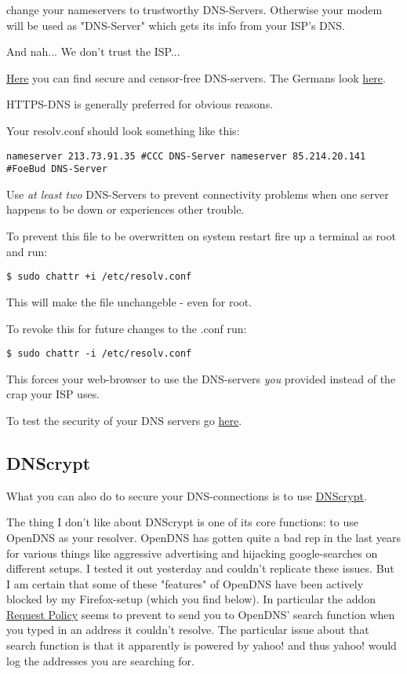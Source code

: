 \documentclass{article}
\begin{document}
 change your nameservers to trustworthy DNS-Servers. Otherwise your modem will be used as "DNS-Server" which gets its info from your ISP's DNS. 

And nah... We don't trust the ISP... 

\href{https://anonymous-proxy-servers.net/wiki/index.php/Censorship-free_DNS_servers}{Here} you can find secure and censor-free DNS-servers. The Germans look \href{https://www.awxcnx.de/handbuch_21g.htm}{here}.


 HTTPS-DNS is generally preferred for obvious reasons. 


 Your resolv.conf should look something like this: 
\begin{lstlisting}
nameserver 213.73.91.35 #CCC DNS-Server nameserver 85.214.20.141 #FoeBud DNS-Server
\end{lstlisting}



 Use \emph{at least two} DNS-Servers to prevent connectivity problems when one server happens to be down or experiences other trouble. 


 To prevent this file to be overwritten on system restart fire up a terminal as root and run: 
\begin{lstlisting}
$ sudo chattr +i /etc/resolv.conf
\end{lstlisting}



 This will make the file unchangeble - even for root. 


 To revoke this for future changes to the .conf run: 
\begin{lstlisting}
$ sudo chattr -i /etc/resolv.conf
\end{lstlisting}



 This forces your web-browser to use the DNS-servers \emph{you} provided instead of the crap your ISP uses.


 To test the security of your DNS servers go \href{https://www.grc.com/dns/dns.htm}{here}.
\subsection{DNScrypt}


 What you can also do to secure your DNS-connections is to use \href{https://www.grc.com/dns/dns.htm}{DNScrypt}. 


 The thing I don't like about DNScrypt is one of its core functions: to use OpenDNS as your resolver. OpenDNS has gotten quite a bad rep in the last years for various things like aggressive advertising and hijacking google-searches on different setups. I tested it out yesterday and couldn't replicate these issues. But I am certain that some of these "features" of OpenDNS have been actively blocked by my Firefox-setup (which you find below). In particular the addon \href{https://addons.mozilla.org/en-US/firefox/addon/requestpolicy/}{Request Policy} seems to prevent to send you to OpenDNS' search function when you typed in an address it couldn't resolve. The particular issue about that search function is that it apparently is powered by yahoo! and thus yahoo! would log the addresses you are searching for. 
\end{document}
